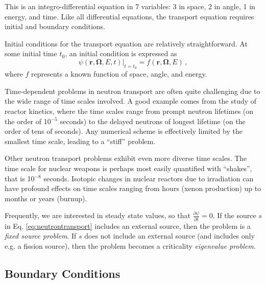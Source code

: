 This is an integro-differential equation in 7 variables: 3 in space, 2 in angle, 1 in energy, and time.  Like all differential equations, the transport equation requires initial and boundary conditions. 


Initial conditions for the transport equation are relatively straightforward.  At some initial time $t_0$, an initial condition is expressed as
\begin{equation}
 \psi(\mathbf{r},\mathbf{\Omega},E,t)|_{t=t_0} = f(\mathbf{r},\mathbf{\Omega},E) \, ,
\end{equation}
where $f$ represents a known function of space, angle, and energy.  

Time-dependent problems in neutron transport are often quite challenging due to the wide range of time scales involved.  A good example comes from the study of reactor kinetics, where the time scales range from prompt neutron lifetimes (on the order of 10$^{-5}$ seconds) to the delayed neutrons of longest lifetime (on the order of tens of seconds).  Any numerical scheme is effectively limited by the smallest time scale, leading to a ``stiff'' problem.  

Other neutron transport problems exhibit even more diverse time scales.  The time scale for nuclear weapons is perhaps most easily quantified with ``shakes'', that is 10$^{-8}$ seconds.  Isotopic changes in nuclear reactors due to irradiation can have profound effects on time scales ranging from hours (xenon production) up to months or years (burnup).

Frequently, we are interested in steady state values, so that $\frac{\partial \psi}{\partial t} = 0$.  If the source $s$ in Eq. \ref{eq:neutrontransport} includes an external source, then the problem is a \textit{fixed source problem}.  If $s$ does not include an external source (and includes only e.g. a fission source), then the problem becomes a criticality \textit{eigenvalue problem}.

\subsection*{Boundary Conditions}

